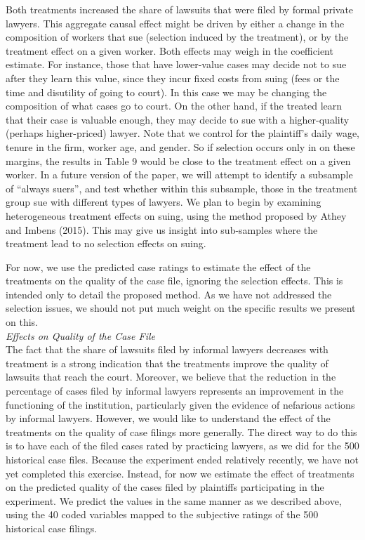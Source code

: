 \documentclass[oneside,12pt]{article}
\begin{document}
Both treatments increased the share of lawsuits that were filed by formal private lawyers. This aggregate causal effect might be driven by either a change in the composition of workers that sue (selection induced by the treatment), or by the treatment effect on a given worker. Both effects may weigh in the coefficient estimate. For instance, those that have lower-value cases may decide not to sue after they learn this value, since they incur fixed costs from suing (fees or the time and disutility of going to court). In this case we may be changing the composition of what cases go to court. On the other hand, if the treated learn that their case is valuable enough, they may decide to sue with a higher-quality (perhaps higher-priced) lawyer. Note that we control for the plaintiff’s daily wage, tenure in the firm, worker age, and gender. So if selection occurs only in on these margins, the results in Table 9 would be close to the treatment effect on a given worker. In a future version of the paper, we will attempt to identify a subsample of “always suers”, and test whether within this subsample, those in the treatment group sue with different types of lawyers. We plan to begin by examining heterogeneous treatment effects on suing, using the method proposed by Athey and Imbens (2015). This may give us insight into sub-samples where the treatment lead to no selection effects on suing. 

For now, we use the predicted case ratings to estimate the effect of the treatments on the quality of the case file, ignoring the selection effects. This is intended only to detail the proposed method. As we have not addressed the selection issues, we should not put much weight on the specific results we present on this. 
\\

\noindent\emph{Effects on Quality of the Case File}\\
The fact that the share of lawsuits filed by informal lawyers decreases with treatment is a strong indication that the treatments improve the quality of lawsuits that reach the court. Moreover, we believe that the reduction in the percentage of cases filed by informal lawyers represents an improvement in the functioning of the institution, particularly given the evidence of nefarious actions by informal lawyers. However, we would like to understand the effect of the treatments on the quality of case filings more generally. The direct way to do this is to have each of the filed cases rated by practicing lawyers, as we did for the 500 historical case files. Because the experiment ended relatively recently, we have not yet completed this exercise. Instead, for now we estimate the effect of treatments on the predicted quality of the cases filed by plaintiffs participating in the experiment. We predict the values in the same manner as we described above, using the 40 coded variables mapped to the subjective ratings of the 500 historical case filings. 
\end{document}
